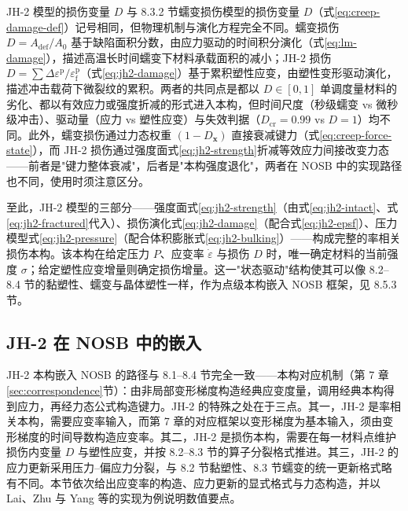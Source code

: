 \begin{remark}
  JH-2 模型的损伤变量 $D$ 与 8.3.2 节蠕变损伤模型的损伤变量 $D$（式\eqref{eq:creep-damage-def}）记号相同，但物理机制与演化方程完全不同。蠕变损伤 $D=A_{\mathrm{def}}/A_{0}$ 基于缺陷面积分数，由应力驱动的时间积分演化（式\eqref{eq:lm-damage}），描述高温长时间蠕变下材料承载面积的减小；JH-2 损伤 $D=\sum\Delta\varepsilon^{\mathrm{p}}/\varepsilon^{\mathrm{p}}_{\mathrm{f}}$（式\eqref{eq:jh2-damage}）基于累积塑性应变，由塑性变形驱动演化，描述冲击载荷下微裂纹的累积。两者的共同点是都以 $D\in[0,1]$ 单调度量材料的劣化、都以有效应力或强度折减的形式进入本构，但时间尺度（秒级蠕变 vs 微秒级冲击）、驱动量（应力 vs 塑性应变）与失效判据（$D_{\mathrm{cr}}=0.99$ vs $D=1$）均不同。此外，蠕变损伤通过力态权重 $(1-D_{\mathbf{x}})$ 直接衰减键力（式\eqref{eq:creep-force-state}），而 JH-2 损伤通过强度面式\eqref{eq:jh2-strength}折减等效应力间接改变力态——前者是"键力整体衰减"，后者是"本构强度退化"，两者在 NOSB 中的实现路径也不同，使用时须注意区分。
\end{remark}

至此，JH-2 模型的三部分——强度面式\eqref{eq:jh2-strength}（由式\eqref{eq:jh2-intact}、式\eqref{eq:jh2-fractured}代入）、损伤演化式\eqref{eq:jh2-damage}（配合式\eqref{eq:jh2-epsf}）、压力模型式\eqref{eq:jh2-pressure}（配合体积膨胀式\eqref{eq:jh2-bulking}）——构成完整的率相关损伤本构。该本构在给定压力 $P$、应变率 $\dot{\varepsilon}$ 与损伤 $D$ 时，唯一确定材料的当前强度 $\sigma$；给定塑性应变增量则确定损伤增量。这一"状态驱动"结构使其可以像 8.2--8.4 节的黏塑性、蠕变与晶体塑性一样，作为点级本构嵌入 NOSB 框架，见 8.5.3 节。

\subsection{JH-2 在 NOSB 中的嵌入}\label{sec:jh2-nosb}

JH-2 本构嵌入 NOSB 的路径与 8.1--8.4 节完全一致——本构对应机制（第 7 章\ref{sec:correspondence}节）：由非局部变形梯度构造经典应变度量，调用经典本构得到应力，再经力态公式构造键力。JH-2 的特殊之处在于三点。其一，JH-2 是率相关本构，需要应变率输入，而第 7 章的对应框架以变形梯度为基本输入，须由变形梯度的时间导数构造应变率。其二，JH-2 是损伤本构，需要在每一材料点维护损伤内变量 $D$ 与塑性应变，并按 8.2--8.3 节的算子分裂格式推进。其三，JH-2 的应力更新采用压力--偏应力分裂，与 8.2 节黏塑性、8.3 节蠕变的统一更新格式略有不同。本节依次给出应变率的构造、应力更新的显式格式与力态构造，并以 Lai、Zhu 与 Yang 等的实现为例说明数值要点。

